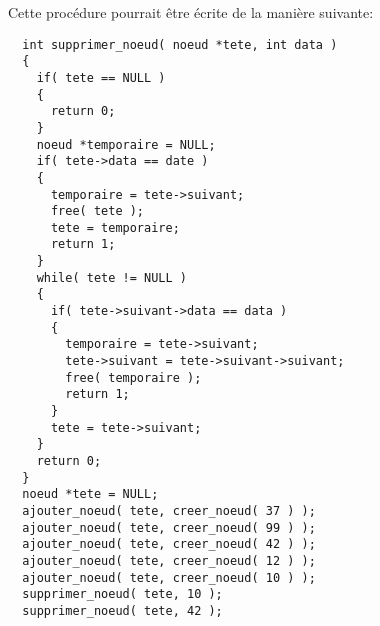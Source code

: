 \documentclass[11pt]{article}
\begin{document}
Cette procédure pourrait être écrite de la manière suivante:
\begin{lstlisting}
  int supprimer_noeud( noeud *tete, int data )
  {
    if( tete == NULL )
    {
      return 0;
    }
    noeud *temporaire = NULL;
    if( tete->data == date )
    {
      temporaire = tete->suivant;
      free( tete );
      tete = temporaire;
      return 1;
    }
    while( tete != NULL )
    {
      if( tete->suivant->data == data )
      {
        temporaire = tete->suivant;
        tete->suivant = tete->suivant->suivant;
        free( temporaire );
        return 1;
      }
      tete = tete->suivant;
    }
    return 0;
  }
  noeud *tete = NULL;
  ajouter_noeud( tete, creer_noeud( 37 ) );
  ajouter_noeud( tete, creer_noeud( 99 ) );
  ajouter_noeud( tete, creer_noeud( 42 ) );
  ajouter_noeud( tete, creer_noeud( 12 ) );
  ajouter_noeud( tete, creer_noeud( 10 ) );
  supprimer_noeud( tete, 10 );
  supprimer_noeud( tete, 42 );
\end{lstlisting}
\end{document}
